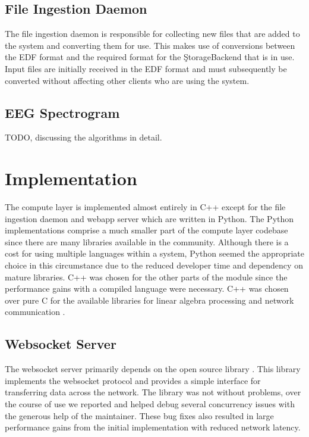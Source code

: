 \subsection{File Ingestion Daemon}

The file ingestion daemon is responsible for collecting new files that are
added to the system and converting them for use. This makes use of conversions
between the EDF format and the required format for the \c{StorageBackend} that
is in use. Input files are initially received in the EDF format and must
subsequently be converted without affecting other clients who are using the
system.

\subsection{EEG Spectrogram}\label{compute-ch:design-spectrogram}

TODO, discussing the algorithms in detail.

\section{Implementation}

The compute layer is implemented almost entirely in C++ except for the file
ingestion daemon and webapp server which are written in Python. The Python
implementations comprise a much smaller part of the compute layer codebase
since there are many libraries available in the community. Although there is a
cost for using multiple languages within a system, Python seemed the
appropriate choice in this circumstance due to the reduced developer time and
dependency on mature libraries. C++ was chosen for the other parts of the
module since the performance gains with a compiled language were necessary. C++
was chosen over pure C for the available libraries for linear algebra
processing \cite{arma} and network communication \cite{websocket-server}.

\subsection{Websocket Server}\label{compute-ch:implementation-ws-server}

The websocket server primarily depends on the open source library
\cite{websocket-server}. This library implements the websocket protocol and
provides a simple interface for transferring data across the network. The
library was not without problems, over the course of use we reported and helped
debug several concurrency issues with the generous help of the maintainer.
These bug fixes also resulted in large performance gains from the initial
implementation with reduced network latency. \\

